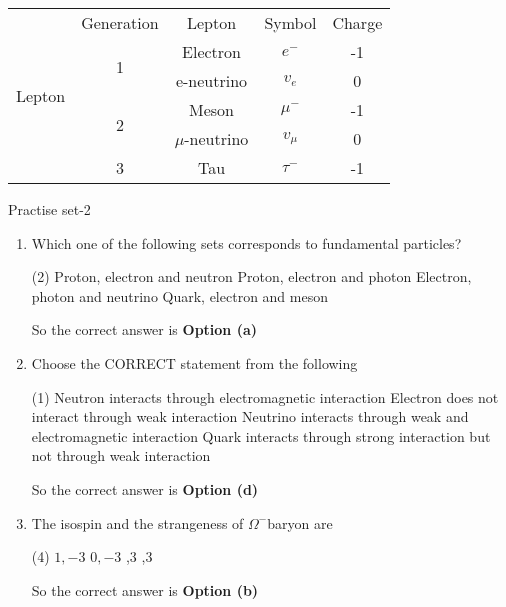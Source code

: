 \begin{tabular}{|c|c|c|c|c|}
	\multirow{6}{*}{Lepton}&Generation&Lepton&Symbol&Charge\\\cline{2-5}
	&\multirow{2}{*}{1}&Electron&$e^-$&-1\\\cline{3-5}
	&&e-neutrino&$v_e$&0\\\cline{2-5}
	&\multirow{2}{*}{2}&Meson&$\mu^-$&-1\\\cline{3-5}
	&&$\mu$-neutrino&$v_\mu$&0\\\cline{2-5}
	&3&Tau&$\tau^-$&-1\\\hline
\end{tabular}


\begin{abox}
	Practise set-2
\end{abox}
\begin{enumerate}
	\item  Which one of the following sets corresponds to fundamental particles?
	 {}
	 \begin{tasks}(2)
		\task[\textbf{a.}]Proton, electron and neutron
		\task[\textbf{b.}]Proton, electron and photon
		\task[\textbf{c.}]Electron, photon and neutrino
		\task[\textbf{d.}]Quark, electron and meson 
	\end{tasks}
\begin{answer}
So the correct answer is \textbf{Option (a)}
\end{answer}
	\item  Choose the CORRECT statement from the following
	 \begin{tasks}(1)
		\task[\textbf{a.}]Neutron interacts through electromagnetic interaction
		\task[\textbf{b.}]Electron does not interact through weak interaction
		\task[\textbf{c.}]Neutrino interacts through weak and electromagnetic interaction
		\task[\textbf{d.}] Quark interacts through strong interaction but not through weak interaction
	\end{tasks}
\begin{answer}
	So the correct answer is \textbf{Option (d)}
\end{answer}
	\item  The isospin and the strangeness of $\Omega^{-}$baryon are
	{}
	 \begin{tasks}(4)
		\task[\textbf{a.}]$1,-3$
		\task[\textbf{b.}]$0,-3$
		,3
		,3 
	\end{tasks}
\begin{answer}
	So the correct answer is \textbf{Option (b)}
\end{answer}

\end{enumerate}
